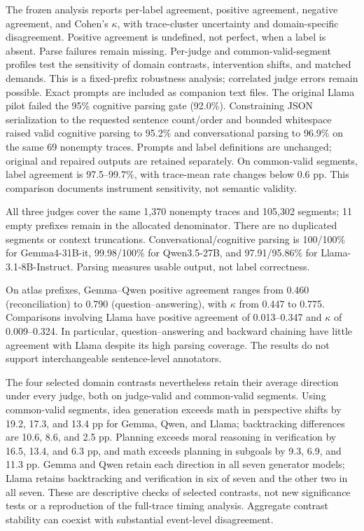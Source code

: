 The frozen analysis reports per-label agreement, positive agreement, negative agreement, and Cohen's $\kappa$, with trace-cluster uncertainty and domain-specific disagreement. Positive agreement is undefined, not perfect, when a label is absent. Parse failures remain missing. Per-judge and common-valid-segment profiles test the sensitivity of domain contrasts, intervention shifts, and matched demands. This is a fixed-prefix robustness analysis; correlated judge errors remain possible. Exact prompts are included as companion text files. The original Llama pilot failed the 95\% cognitive parsing gate (92.0\%). Constraining JSON serialization to the requested sentence count/order and bounded whitespace raised valid cognitive parsing to 95.2\% and conversational parsing to 96.9\% on the same 69 nonempty traces. Prompts and label definitions are unchanged; original and repaired outputs are retained separately. On common-valid segments, label agreement is 97.5--99.7\%, with trace-mean rate changes below 0.6 pp. This comparison documents instrument sensitivity, not semantic validity.

All three judges cover the same 1,370 nonempty traces and 105,302 segments; 11 empty prefixes remain in the allocated denominator. There are no duplicated segments or context truncations. Conversational/cognitive parsing is 100/100\% for Gemma4-31B-it, 99.98/100\% for Qwen3.5-27B, and 97.91/95.86\% for Llama-3.1-8B-Instruct. Parsing measures usable output, not label correctness.

On atlas prefixes, Gemma--Qwen positive agreement ranges from 0.460 (reconciliation) to 0.790 (question--answering), with $\kappa$ from 0.447 to 0.775. Comparisons involving Llama have positive agreement of 0.013--0.347 and $\kappa$ of 0.009--0.324. In particular, question--answering and backward chaining have little agreement with Llama despite its high parsing coverage. The results do not support interchangeable sentence-level annotators.

The four selected domain contrasts nevertheless retain their average direction under every judge, both on judge-valid and common-valid segments. Using common-valid segments, idea generation exceeds math in perspective shifts by 19.2, 17.3, and 13.4 pp for Gemma, Qwen, and Llama; backtracking differences are 10.6, 8.6, and 2.5 pp. Planning exceeds moral reasoning in verification by 16.5, 13.4, and 6.3 pp, and math exceeds planning in subgoals by 9.3, 6.9, and 11.3 pp. Gemma and Qwen retain each direction in all seven generator models; Llama retains backtracking and verification in six of seven and the other two in all seven. These are descriptive checks of selected contrasts, not new significance tests or a reproduction of the full-trace timing analysis. Aggregate contrast stability can coexist with substantial event-level disagreement.

